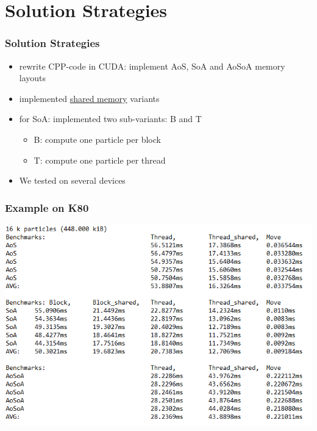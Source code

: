 \documentclass[aspectratio=169]{beamer}
\begin{document}
\section{Solution Strategies}
\begin{frame}
	\frametitle{Solution Strategies}
	\begin{itemize}
		\item rewrite CPP-code in CUDA: implement AoS, SoA and AoSoA memory layouts
		\item implemented \underline{shared memory} variants
		\item for SoA: implemented two sub-variants: B and T
			\begin{itemize}
				\item B: compute one particle per block
				\item T: compute one particle per thread
			\end{itemize}
		\item We tested on several devices
	\end{itemize}
\end{frame}

\begin{frame}
	\frametitle{Example on K80}
	\includegraphics[scale=0.5]{resources/data-example.png}
\end{frame}
\end{document}
